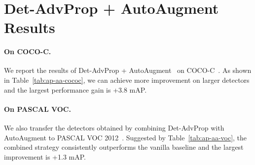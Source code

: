 \documentclass[final]{cvpr}
\begin{document}
\appendix

\section{Det-AdvProp + AutoAugment Results}

\paragraph{On COCO-C.}
\label{app:coco-c}
We report the results of Det-AdvProp + AutoAugment~\cite{zoph2019learning} on COCO-C~\cite{michaelis2020benchmarking}.
As shown in Table~\ref{tab:ap-aa-cococ}, we can achieve more improvement on larger detectors and the largest performance gain is +3.8 mAP.

\begin{table}[!htb]
\centering
{}
\smallskip
\caption{The comparison of Det-AdvProp + AutoAugment and the vanilla baseline on COCO-C.}
\vspace{-10pt}
\label{tab:ap-aa-cococ}
\end{table}


\paragraph{On PASCAL VOC.}
\label{app:voc}
We also transfer the detectors obtained by combining Det-AdvProp with AutoAugment to PASCAL VOC 2012~\cite{pascal-voc-2012}. 
Suggested by Table~\ref{tab:ap-aa-voc}, the combined strategy consistently outperforms the vanilla baseline and the largest improvement is +1.3 mAP.
\end{document}

